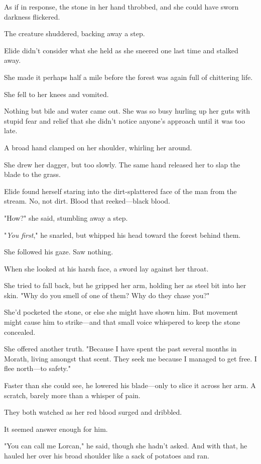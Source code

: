 As if in response, the stone in her hand throbbed, and she could have sworn darkness flickered.

The creature shuddered, backing away a step.

Elide didn't consider what she held as she sneered one last time and stalked away.

She made it perhaps half a mile before the forest was again full of chittering life.

She fell to her knees and vomited.

Nothing but bile and water came out.
She was so busy hurling up her guts with stupid fear and relief that she didn't notice anyone's approach until it was too late.

A broad hand clamped on her shoulder, whirling her around.

She drew her dagger, but too slowly.
The same hand released her to slap the blade to the grass.

Elide found herself staring into the dirt-splattered face of the man from the stream.
No, not dirt.
Blood that reeked---black blood.

"How?"
she said, stumbling away a step.

"\emph{You first}," he snarled, but whipped his head toward the forest behind them.

She followed his gaze.
Saw nothing.

When she looked at his harsh face, a sword lay against her throat.

She tried to fall back, but he gripped her arm, holding her as steel bit into her skin.
"Why do you smell of one of them?
Why do they chase you?"

She'd pocketed the stone, or else she might have shown him.
But movement might cause him to strike---and that small voice whispered to keep the stone concealed.

She offered another truth.
"Because I have spent the past several months in Morath, living amongst that scent.
They seek me because I managed to get free.
I flee north---to safety."

Faster than she could see, he lowered his blade---only to slice it across her arm.
A scratch, barely more than a whisper of pain.

They both watched as her red blood surged and dribbled.

It seemed answer enough for him.

"You can call me Lorcan," he said, though she hadn't asked.
And with that, he hauled her over his broad shoulder like a sack of potatoes and ran.

